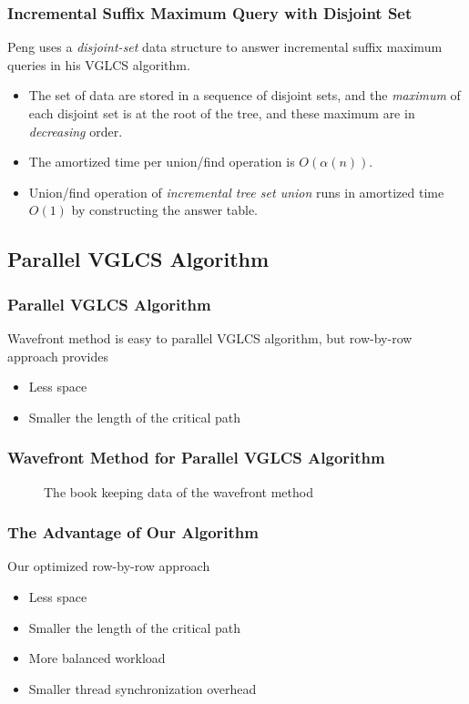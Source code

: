 \begin{frame}
    \frametitle{Incremental Suffix Maximum Query with Disjoint Set}

    Peng uses a {\em disjoint-set} data structure to answer incremental
	suffix maximum queries in his VGLCS algorithm.

	\begin{itemize}
		\setlength\itemsep{1em}
		\item 
			The set of data are stored in a sequence of disjoint sets,
			and the {\em maximum} of each disjoint set is at the root of
			the tree, and these maximum are in {\em decreasing} order.
		\item
			The amortized time per union/find operation is
			$O(\alpha(n))$.
		\item
			Union/find operation of {\em incremental tree set union}
			runs in amortized time $O(1)$ by constructing the answer
			table.
	\end{itemize}
\end{frame}

\subsection{Parallel VGLCS Algorithm}
\begin{frame}
    \frametitle{Parallel VGLCS Algorithm}
	Wavefront method is easy to parallel VGLCS algorithm, but row-by-row
	approach provides

    \begin{itemize}
    	\setlength\itemsep{1em}
		\item 
			Less space
		\item 
			Smaller the length of the critical path
    \end{itemize}
\end{frame}

\begin{frame}
	\frametitle{Wavefront Method for Parallel VGLCS Algorithm}
	\begin{figure}[!thb]
	  \centering {} 
	  \caption{The book keeping data of the wavefront method}
	  \label{fig:fig-VGLCS-dp-wavefront}
	\end{figure}
\end{frame}

\begin{frame}
	\frametitle{The Advantage of Our Algorithm}
	Our optimized row-by-row approach
	\begin{itemize}
		\setlength\itemsep{1em}
		\item 
			Less space
		\item 
			Smaller the length of the critical path
		\item 
			More balanced workload
		\item 
			Smaller thread synchronization overhead
	\end{itemize}
\end{frame}

